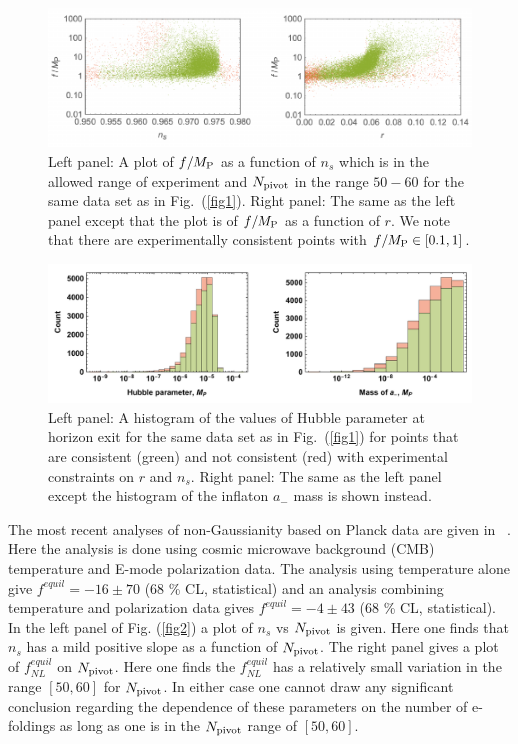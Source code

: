 \documentclass[a4paper,11pt]{article}
\begin{document}
  \begin{figure}
    \centering
    \includegraphics[width=1.0\textwidth]{figs/fig4.pdf}
    \caption{
      Left panel: A plot of $f / M_{\rm P}$ as a function of $n_s$ which is in the allowed range of
      experiment and $N_{\rm pivot}$ in the range $50-60$ for the same data set as in
      Fig.~(\ref{fig1}).
      Right panel: The same as the left panel except that the plot is of $f / M_{\rm P}$ as a
      function of $r$.
      We note that there are
      experimentally consistent points with $f/M_{\rm P} \in \left[0.1, 1\right]$.}
    \label{fig4}
  \end{figure}

  \begin{figure}
    \centering
    \includegraphics[width=1.0\textwidth]{figs/fig5.pdf}
    \caption{
      Left panel: A histogram of the values of Hubble parameter at horizon exit for the same
      data set as in Fig.~(\ref{fig1}) for points that are consistent (green) and not consistent (red)
      with experimental constraints on $r$ and $n_s$.
      Right panel: The same as the left panel except the histogram of the inflaton $a_-$ mass is
      shown instead.}
    \label{fig5}
  \end{figure}

  The most recent analyses of non-Gaussianity based on Planck data are given in ~\cite{Ade:2015ava}.
  Here the analysis is done using cosmic microwave background (CMB) temperature and E-mode polarization 
  data. The  analysis using 
  temperature alone give $f^{equil} = -16 \pm 70$ (68 \% CL, statistical) and an analysis combining temperature and polarization data 
  gives $f^{equil} = -4 \pm 43$ (68 \% CL, statistical).
    In the left panel of Fig. (\ref{fig2})
  a plot of $n_s$ vs $N_{\rm pivot}$ is given. Here one finds that $n_s$ has a mild positive slope as a function of $N_{\rm pivot}$.
  The right panel gives a plot of $f^{equil}_{NL}$ on $N_{\rm pivot}$. Here one finds the $f^{equil}_{NL}$ has a relatively small variation in the range $[50,60]$ for
  $N_{\rm pivot}$. In either case one cannot draw any significant conclusion regarding the dependence of these parameters
  on the number of e-foldings as long as one is in the $N_{\rm pivot}$ range of $[50,60]$.
\end{document}
